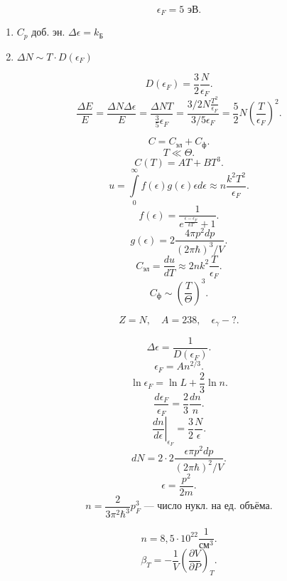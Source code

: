 \documentclass[a4paper]{article}
\begin{document}
\begin{hiProb}[Задача 3.5]
\[
\epsilon_F=5\text{ эВ}
.\] 
\end{hiProb}
\begin{sol}
\begin{figure}[ht]
    \centering
    \caption{}
    \label{fig:4}
\end{figure}
\begin{enumerate}
\item $C_p$ доб. эн. $\Delta \epsilon =k_\text{Б}$
\item $\Delta N \sim  T\cdot D(\epsilon_F)$
\end{enumerate}
\[
	D(\epsilon_F)= \frac{3}{2}\frac{N}{\epsilon_F}
.\] 
\[
\frac{\Delta E}{E}= \frac{\Delta N \Delta \epsilon }{E}=
\frac{\Delta N T}{\frac{3}{5}\epsilon_F}=
\frac{3 /2 N \frac{T^2}{\epsilon_F}}{3 /5 \epsilon_F}=\frac{5}{2}N
\left( \frac{T}{\epsilon_F} \right) ^2
.\] 
\end{sol}
\begin{hiProb}[Задача 3.44]
\end{hiProb}
\begin{sol}
	\[
	C=C_\text{эл}+C_{\text{ф}}
	.\] 
	\[
	T\ll \Theta
	.\] 
	\[
		C(T)=AT+BT^3
	.\] 
\[
	u=\int\limits_{0}^{\infty}f(\epsilon) g(\epsilon) \epsilon
	d\epsilon \approx n \frac{k^2 T^2}{\epsilon_F}
.\] 
\[
	f(\epsilon)= \frac{1}{e^{\frac{\epsilon-\epsilon_F}{kT}}+1}
.\] 
\[
	g(\epsilon) =2 \frac{4\pi p^2 dp}{(2\pi \hbar)^3 /V}
.\] 
\[
C_\text{эл}= \frac{du}{dT}\approx 2nk^2 \frac{T}{\epsilon_F}
.\] 
\[
	C_\text{ф}\sim  \left( \frac{T}{\Theta} \right) ^{3}
.\] 
\end{sol}
\begin{hiProb}[Задача 3.17]
\[
	Z=N,\quad A=238,\quad \epsilon_\gamma-?
.\] 
\end{hiProb}
\begin{sol}
\begin{figure}[ht]
    \centering
    \caption{}
    \label{fig:5}
\end{figure}
\[
	\Delta \epsilon= \frac{1}{D(\epsilon_F)}
.\] 
\[
\epsilon_F= A n^{2 /3}
.\] 
\[
\ln \epsilon_F= \ln L+ \frac{2}{3} \ln n
.\] 
\[
\frac{d \epsilon_F}{\epsilon_F}= \frac{2}{3} \frac{dn}{n}
.\] 
\[
\left. \frac{dn}{d\epsilon } \right|_{\epsilon_F}= \frac{3}{2} \frac{N}{\epsilon}
.\] 
\[
	dN=2\cdot 2 \frac{\epsilon \pi p^2 dp}{(2\pi \hbar)^2 /V}
.\] 
\[
\epsilon= \frac{p^2}{2m}
.\] 
\[
n= \frac{2}{3\pi^2 \hbar^3}p_F^3 \text{ --- число нукл. на ед. объёма}
.\] 
\end{sol}
\begin{hiProb}[Задача 3.22]
\[
n=8,5 \cdot 10^{22} \frac{1}{\text{см}^3}
.\] 
\[
	\beta_T= -\frac{1}{V}\left( \frac{\partial V}{\partial P}  \right) _T
.\] 
\end{hiProb}
\end{document}
